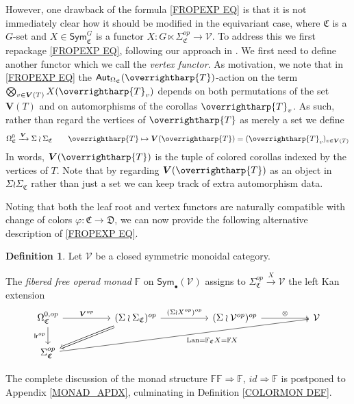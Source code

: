 \documentclass[a4paper,10pt
,draft
]{article}%
\numberwithin{equation}{section}
\numberwithin{figure}{section}
\theoremstyle{definition} %
\newtheorem{definition}[equation]{Definition}%
\newcommand{\vect}[1]{\text{\overrightharp{\ensuremath{#1}}}}
\DeclareMathOperator{\Lan}{Lan}%
\newcommand{\V}{\ensuremath{\mathcal V}}
\newcommand{\1}{\ensuremath{\mathbbm 1}}%
\begin{document}
However, one drawback of the formula  
\eqref{FROPEXP EQ}
is that it is not immediately clear how it should be modified 
in the equivariant case,
where $\mathfrak{C}$ is a $G$-set
and $X \in \mathsf{Sym}^G_{\mathfrak{C}}$
is a functor 
$X \colon G \ltimes \Sigma_{\mathfrak{C}}^{op} \to \V$.
To address this we first repackage \eqref{FROPEXP EQ}, 
following our approach in {\color{red} \cite{BP_geo}}.
We first need to define another functor which we call the \emph{vertex functor}.
As motivation, we note that
in \eqref{FROPEXP EQ}
the $\mathsf{Aut}_{\Omega_{\mathfrak{C}}}(\vect{T})$-action
on the term
$\bigotimes_{v \in \boldsymbol{V}(T)} X(\vect{T}_v)$
depends on both permutations 
of the set $\boldsymbol{V}(T)$
and on automorphisms of the corollas $\vect{T}_v$.
As such, rather than regard the vertices of $\vect{T}$ as merely a set
we define 
\begin{equation}\label{VFUNDEF EQ}
\Omega_{\mathfrak{C}}^0 \xrightarrow{\boldsymbol{V}} \Sigma \wr \Sigma_{\mathfrak{C}}
\qquad 
\vect{T} \mapsto 
\boldsymbol{V}(\vect{T})=(\vect{T}_v )_{v \in \boldsymbol{V}(T)}
\end{equation}
In words, $\boldsymbol{V}(\vect{T})$
is the tuple of colored corollas indexed by the vertices of $T$. 
Note that
by regarding $\boldsymbol{V}(\vect{T})$ as an object in 
$\Sigma \wr \Sigma_{\mathfrak{C}}$ rather than just a set we can keep track of extra automorphism data.

Noting that both the leaf root and vertex functors are naturally compatible with change of colors 
$\varphi \colon \mathfrak{C} \to \mathfrak{D}$, 
we can now provide the following alternative 
description of \eqref{FROPEXP EQ}.



\begin{definition}\label{FREEOP DEF}
Let $\mathcal{V}$ be a closed symmetric monoidal category.

The \textit{fibered free operad monad} $\mathbb{F}$ on $\mathsf{Sym}_\bullet(\mathcal{V})$ 
assigns to 
$\Sigma_{\mathfrak{C}}^{op} \xrightarrow{X} \mathcal{V}$
the left Kan extension
\begin{equation}\label{FREEOP_EQ}
\begin{tikzcd}[column sep = 50pt]
	\Omega^{0,op}_{\mathfrak{C}}
	\arrow[d, "\mathsf{lr}^{op}"']
	\arrow[r, "\boldsymbol{V}^{op}"]
&
	(\Sigma \wr \Sigma_{\mathfrak{C}})^{op} \arrow[r, "(\Sigma \wr X^{op})^{op}"]
	\arrow[dl, Rightarrow]
&
	(\Sigma \wr \V^{op})^{op} \arrow[r, "\otimes"]
&
	\V
\\
	\Sigma^{op}_{\mathfrak{C}}
	\arrow[urrr, "\Lan = \mathbb F_{\mathfrak{C}} X = \mathbb F X"']
\end{tikzcd}
\end{equation}
\end{definition}
The complete discussion of the monad structure
$\mathbb{F}\mathbb{F} \Rightarrow \mathbb{F}$,
$id \Rightarrow \mathbb{F}$ is postponed to Appendix \ref{MONAD_APDX},
culminating in Definition \ref{COLORMON DEF}.
\end{document}
